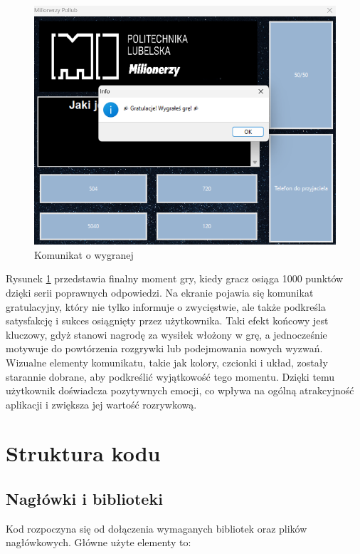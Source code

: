 \documentclass[]{article}
\begin{document}
	\begin{figure}[H]
		\centering
		\includegraphics[scale=0.3]{9.png}
		\caption{Komunikat o wygranej}
		\label{rys:8}
	\end{figure}
Rysunek \ref{rys:8} przedstawia finalny moment gry, kiedy gracz osiąga 1000 punktów dzięki serii poprawnych odpowiedzi. Na ekranie pojawia się komunikat gratulacyjny, który nie tylko informuje o zwycięstwie, ale także podkreśla satysfakcję i sukces osiągnięty przez użytkownika. Taki efekt końcowy jest kluczowy, gdyż stanowi nagrodę za wysiłek włożony w grę, a jednocześnie motywuje do powtórzenia rozgrywki lub podejmowania nowych wyzwań. Wizualne elementy komunikatu, takie jak kolory, czcionki i układ, zostały starannie dobrane, aby podkreślić wyjątkowość tego momentu. Dzięki temu użytkownik doświadcza pozytywnych emocji, co wpływa na ogólną atrakcyjność aplikacji i zwiększa jej wartość rozrywkową.

	\section{Struktura kodu}
	
	\subsection{Nagłówki i biblioteki}
	
	Kod rozpoczyna się od dołączenia wymaganych bibliotek oraz plików nagłówkowych. Główne użyte elementy to:
	
\end{document}
